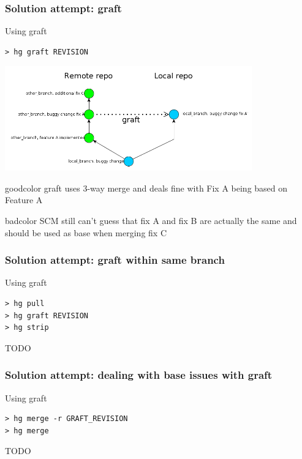 \documentclass{beamer}
\begin{document}
\begin{frame}[fragile]
\frametitle{Solution attempt: graft}
\begin{exampleblock}{Using graft}
\begin{verbatim}
> hg graft REVISION
\end{verbatim}
\end{exampleblock}
\begin{center}
\includegraphics[width=0.8\textwidth]{img/using_graft}
\end{center}

\begin{beamercolorbox}[rounded=true,center,shadow=true]{goodcolor}
  graft uses 3-way merge and deals fine with Fix A being based on Feature A
\end{beamercolorbox}
\begin{beamercolorbox}[rounded=true,center,shadow=true]{badcolor}
  SCM still can't guess that fix A and fix B are actually the same and should be used as base when merging fix C
\end{beamercolorbox}
\end{frame}

\begin{frame}[fragile]
\frametitle{Solution attempt: graft within same branch}
\begin{exampleblock}{Using graft}
\begin{verbatim}
> hg pull
> hg graft REVISION
> hg strip
\end{verbatim}
\end{exampleblock}
TODO
\end{frame}

\begin{frame}[fragile]
\frametitle{Solution attempt: dealing with base issues with graft}
\begin{exampleblock}{Using graft}
\begin{verbatim}
> hg merge -r GRAFT_REVISION
> hg merge
\end{verbatim}
\end{exampleblock}
TODO
\end{frame}
\end{document}
